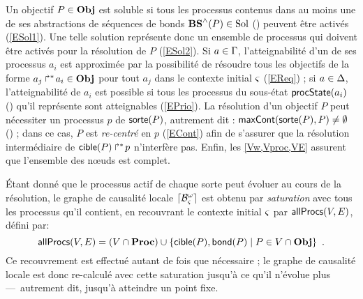 Un objectif $P \in \mathbf{Obj}$ est soluble si tous les processus contenus dans au moins une de ses
abstractions de séquences de bonds $\mathbf{BS}^\wedge(P) \in \mathrm{Sol}$ (\cf {})
peuvent être activés (\eqref{ESol1}).
Une telle solution représente donc un ensemble de processus qui doivent être activés
pour la résolution de $P$ (\eqref{ESol2}).
Si $a \in \Gamma$, l'atteignabilité d'un de ses processus $a_i$ est approximée par
la possibilité de résoudre tous les objectifs de la forme $\mbox{${a}_{j}\Rsh^*\!{a}_{i}$} \in \mathbf{Obj}$
pour tout $a_j$ dans le contexte initial $\varsigma$ (\eqref{EReq}) ;
si $a \in \Delta$, l'atteignabilité de $a_i$ est possible si tous les processus du sous-état
$\mathsf{procState}(a_i)$ (\cf {}) qu'il représente sont atteignables (\eqref{EPrio}).
La résolution d'un objectif $P$ peut nécessiter un processus $p$ de $\mathsf{sorte}(P)$,
autrement dit : $\mathsf{maxCont}(\mathsf{sorte}(P), P) \neq \emptyset$ (\cf {}) ;
dans ce cas, $P$ est \emph{re-centré} en $p$ (\eqref{ECont})
afin de s'assurer que la résolution intermédiaire de $\mbox{$\mathsf{cible}(P)\Rsh^*\!p$}$ n'interfère pas.
Enfin, les \eqref{Vw,Vproc,VE} assurent que l'ensemble des nœuds est complet.

Étant donné que le processus actif de chaque sorte peut évoluer au cours de la résolution,
le graphe de causalité locale $\lceil \mathcal{B}_\varsigma^\omega\rceil$ est obtenu par \emph{saturation} avec tous les processus
qu'il contient, \cad en recouvrant le contexte initial $\varsigma$ par $\mathsf{allProcs}(V, E)$, défini par:
  \[\mathsf{allProcs}(V, E) = (V \cap \mathbf{Proc}) \cup
    \{ \mathsf{cible}(P), \mathsf{bond}(P) \mid P \in V \cap \mathbf{Obj} \} \enspace.\]
Ce recouvrement est effectué autant de fois que nécessaire ;
le graphe de causalité locale est donc re-calculé avec cette saturation
jusqu'à ce qu'il n'évolue plus ---~autrement dit, jusqu'à atteindre un point fixe.

